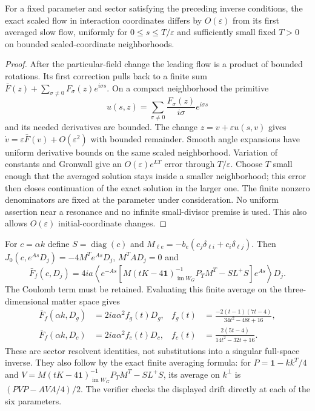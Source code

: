 \documentclass[11pt,a4paper]{article}
\newcommand{\id}{\mathbf1}\newcommand{\tr}{\operatorname{tr}}\newcommand{\diag}{\operatorname{diag}}\newcommand{\Fix}{\operatorname{Fix}}\newcommand{\Rea}{\operatorname{Re}}
\begin{document}
\newpage
\begin{lemma}\label{lem:avg}
For a fixed parameter and sector satisfying the preceding inverse conditions, the exact scaled flow in interaction coordinates differs by $O(\varepsilon)$ from its first averaged slow flow, uniformly for $0\leq s\leq T/\varepsilon$ and sufficiently small fixed $T>0$ on bounded scaled-coordinate neighborhoods.
\end{lemma}
\begin{proof}
After the particular-field change the leading flow is a product of bounded rotations. Its first correction pulls back to a finite sum
$\bar F(z)+\sum_{\sigma\ne0}F_\sigma(z)e^{i\sigma s}$.
On a compact neighborhood the primitive
\[
u(s,z)=\sum_{\sigma\ne0}\frac{F_\sigma(z)}{i\sigma}e^{i\sigma s}
\]
and its needed derivatives are bounded. The change $z=v+\varepsilon u(s,v)$ gives $\dot v=\varepsilon\bar F(v)+O(\varepsilon^2)$ with bounded remainder. Smooth angle expansions have uniform derivative bounds on the same scaled neighborhood. Variation of constants and Gronwall give an $O(\varepsilon)e^{LT}$ error through $T/\varepsilon$. Choose $T$ small enough that the averaged solution stays inside a smaller neighborhood; this error then closes continuation of the exact solution in the larger one. The finite nonzero denominators are fixed at the parameter under consideration. No uniform assertion near a resonance and no infinite small-divisor premise is used. This also allows $O(\varepsilon)$ initial-coordinate changes.
\end{proof}
For $c=\alpha k$ define $S=\diag(c)$ and $M_{\ell e}=-b_e(c_j\delta_{\ell i}+c_i\delta_{\ell j})$. Then $J_0(c,e^{As}D_j)=-4M^Te^{As}D_j$, $M^TAD_j=0$ and
\[
\bar F_f(c,D_j)=4ia\left\langle e^{-As}
\left[M(tK-4\id)^{-1}_{\operatorname{im}W_G}P_TM^T-SL^+S\right]e^{As}\right\rangle D_j.
\]
The Coulomb term must be retained. Evaluating this finite average on the three-dimensional matter space gives
\begin{align*}
\bar F_f(\alpha k,D_g)&=2ia\alpha^2 f_g(t)D_g,
& f_g(t)&=\frac{-2(t-1)(7t-4)}{34t^2-48t+16},\\
\bar F_f(\alpha k,D_c)&=2ia\alpha^2 f_c(t)D_c,
& f_c(t)&=\frac{2(5t-4)}{14t^2-32t+16}.
\end{align*}
These are sector resolvent identities, not substitutions into a singular full-space inverse. They also follow by the exact finite averaging formula: for $P=\id-kk^T/4$ and $V=M(tK-4\id)^{-1}_{\operatorname{im}W_G}P_TM^T-SL^+S$, its average on $k^\perp$ is $(PVP-AVA/4)/2$. The verifier checks the displayed drift directly at each of the six parameters.
\end{document}
